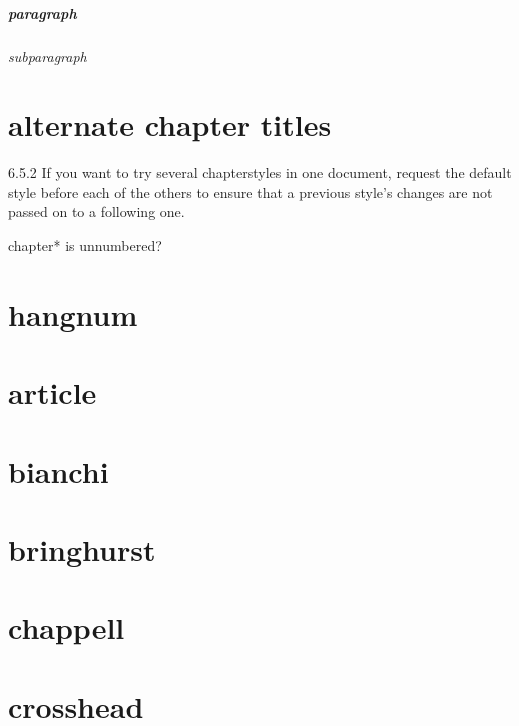 \documentclass[a4paper, 12pt]{memoir}
\begin{document}
\paragraph*{paragraph} 
\subparagraph*{subparagraph} 





\chapter*{ alternate chapter titles }
 
6.5.2
If you want to try several chapterstyles in one document, request the default style
before each of the others to ensure that a previous style’s changes are not passed on to a
following one.

chapter* is unnumbered?

\chapter{ hangnum } 

\chapter{ article } 

\chapter{bianchi} 

\chapter{bringhurst} 

 
\chapter{chappell} 

\chapter{crosshead} 

\end{document}
